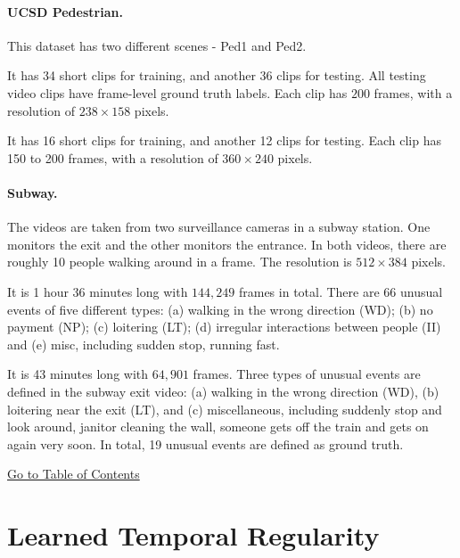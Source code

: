 \documentclass[10pt,twocolumn,letterpaper]{article}
\begin{document}
\paragraph{\bf UCSD Pedestrian.}
This dataset has two different scenes - Ped1 and Ped2.

\vspace{1em}
 It has 34 short clips for training, and another 36 clips for testing. 
All testing video clips have frame-level ground truth labels. 
Each clip has $200$ frames, with a resolution of $238\times 158$ pixels.

\vspace{1em}
 It has 16 short clips for training, and another 12 clips for testing. 
Each clip has 150 to 200 frames, with a resolution of $360\times240$ pixels.


\paragraph{\bf Subway.}
The videos are taken from two surveillance cameras in a subway station. 
One monitors the exit and the other monitors the entrance. 
In both videos, there are roughly 10 people walking around in a frame. The resolution is $512\times384$ pixels.

\vspace{1em}
It is 1 hour 36 minutes long with $144,249$ frames in total. 
There are $66$ unusual events of five different types: (a) walking in the wrong direction (WD); (b) no payment (NP); (c) loitering (LT); (d) irregular interactions between people (II) and (e) misc, including sudden stop, running fast.

\vspace{1em}
It is 43 minutes long with $64,901$ frames. Three types of unusual events are defined in the subway exit video: (a) walking in the wrong direction (WD), (b) loitering near the exit (LT), and (c) miscellaneous, including suddenly stop and look around, janitor cleaning the wall, someone gets off the train and gets on again very soon. 
In total, 19 unusual events are defined as ground truth.

\begin{center}
	\hyperlink{page.11}{Go to Table of Contents}
\end{center}
\clearpage
 

\section{Learned Temporal Regularity}
\label{sec:temp_regularity}
\end{document}

